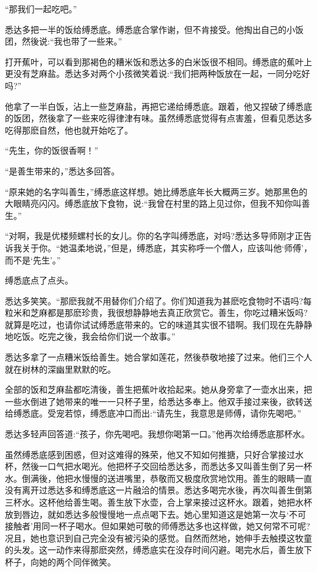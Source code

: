 \documentclass[12pt,twoside,openany]{book}
\begin{document}
“那我们一起吃吧。”

悉达多把一半的饭给缚悉底。缚悉底合掌作谢，但不肯接受。他掏出自己的小饭团，然後说:“我也带了一些来。”

打开蕉叶，可以看到那褐色的糟米饭和悉达多的白米饭很不相同。缚悉底的蕉叶上更没有芝麻盐。悉达多对两个小孩微笑着说:“我们把两种饭放在一起，一同分吃好吗?”

他拿了一半白饭，沾上一些芝麻盐，再把它递给缚悉底。跟着，他又捏破了缚悉底的饭团，然後拿了一些来吃得律津有味。虽然缚悉底觉得有点害羞，但看见悉达多吃得那麽自然，他也就开始吃了。

“先生，你的饭很香啊！”

“是善生带来的，”悉达多回答。

“原来她的名字叫善生，”缚悉底这样想。她比缚悉底年长大概两三岁。她那黑色的大眼睛亮闪闪。缚悉底放下食物，说:“我曾在村里的路上见过你，但我不知你叫善生。”

“对啊，我是优楼频螺村长的女儿。你的名字叫缚悉底，对吗?悉达多导师刚才正告诉我关于你。“她温柔地说，”但是，缚悉底，其实称呼一个僧人，应该叫他‘师傅’，而不是‘先生’。”

缚悉底点了点头。

悉达多笑笑。“那麽我就不用替你们介绍了。你们知道我为甚麽吃食物时不语吗?每粒米和芝麻都是那麽珍贵，我很想静静地去真正欣赏它。善生，你吃过糟米饭吗?就算是吃过，也请你试试缚悉底带来的。它的味道其实很不错啊。我们现在先静静地吃饭。吃完之後，我会给你们说一个故事。”

悉达多拿了一点糟米饭给善生。她合掌如莲花，然後恭敬地接了过来。他们三个人就在树林的深幽里默默的吃。

全部的饭和芝麻盐都吃清後，善生把蕉叶收拾起来。她从身旁拿了一壶水出来，把一些水倒进了她带来的唯一一只杯子里，给悉达多奉上。他双手接过来後，欲转送给缚悉底。受宠若惊，缚悉底冲口而出:“请先生，我意思是师傅，请你先喝吧。”

悉达多轻声回答道:“孩子，你先喝吧。我想你喝第一口。”他再次给缚悉底那杯水。

虽然缚悉底感到困惑，但对这难得的殊荣，他又不知如何推搪，只好合掌接过水杯，然後一口气把水喝光。他把杯子交回给悉达多，而悉达多又叫善生倒了另一杯水。倒满後，他把水慢慢的送进嘴里，恭敬而又极度欣赏地饮用。善生的眼睛一直没有离开过悉达多和缚悉底这一片融洽的情景。悉达多喝完水後，再次叫善生倒第三杯水。这杯他给善生喝。善生放下水壶，合上掌来接过这杯水。跟着，她把水杯放到唇边，就如悉达多般慢慢地一点点喝下去。她心里知道这是她第一次与‘不可接触者’用同一杯子喝水。但如果她可敬的师傅悉达多也这样做，她又何常不可呢?况且，她也意识到自己完全没有被污染的感觉。自然而然地，她伸手去触摸这牧童的头发。这一动作来得那麽突然，缚悉底实在没存时间闪避。喝完水后，善生放下杯子，向她的两个同伴微笑。
\end{document}
